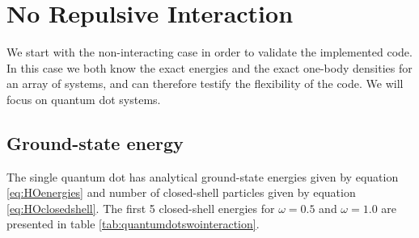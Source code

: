 \section{No Repulsive Interaction}
We start with the non-interacting case in order to validate the implemented code. In this case we both know the exact energies and the exact one-body densities for an array of systems, and can therefore testify the flexibility of the code. We will focus on quantum dot systems.

\subsection{Ground-state energy}
The single quantum dot has analytical ground-state energies given by equation \eqref{eq:HOenergies} and number of closed-shell particles given by equation \eqref{eq:HOclosedshell}. The first 5 closed-shell energies for $\omega=0.5$ and $\omega=1.0$ are presented in table \eqref{tab:quantumdotswointeraction}.

